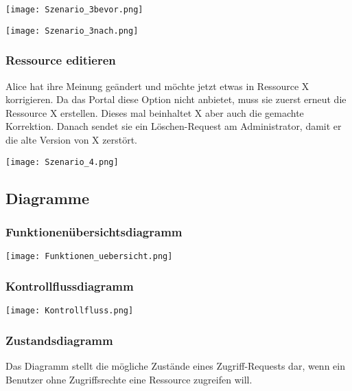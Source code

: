 \documentclass[parskip=full,11pt]{scrartcl}
\begin{document}
	\begin{center}
	\texttt{[image: Szenario\_3bevor.png]}
	
	\texttt{[image: Szenario\_3nach.png]}
	\end{center}

\subsubsection*{Ressource editieren}
Alice hat ihre Meinung geändert und möchte jetzt etwas in Ressource X korrigieren. Da das Portal diese Option nicht anbietet, muss sie zuerst erneut die Ressource X erstellen. Dieses mal beinhaltet X aber auch die gemachte Korrektion. Danach sendet sie ein Löschen-Request am Administrator, damit er die alte Version von X zerstört.\\
	
	\begin{center}
	\texttt{[image: Szenario\_4.png]}
	\end{center}
	
\subsection{Diagramme}

\subsubsection*{Funktionenübersichtsdiagramm}

	\begin{center}
	\texttt{[image: Funktionen\_uebersicht.png]}
	\end{center}
	
\subsubsection*{Kontrollflussdiagramm \grqq}

	\begin{center}
	\texttt{[image: Kontrollfluss.png]}
	\end{center}
	
\subsubsection*{Zustandsdiagramm \grqq}
Das Diagramm stellt die mögliche Zustände eines Zugriff-Requests dar, wenn ein Benutzer ohne Zugriffsrechte eine Ressource zugreifen will.
\\
\end{document}
